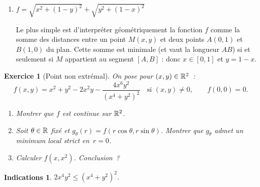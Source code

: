 \documentclass[11pt,a4paper]{article}
\renewcommand{\le}{\leqslant} \renewcommand{\leq}{\leqslant}
\theoremstyle{exostyle}
\newtheorem{exo}{Exercice}
\newtheorem{ind}{Indications}
\newcommand{\exercice}[1]{} \newcommand{\finexercice}{}
\newcommand{\enonce}{\begin{exo}} \newcommand{\finenonce}{\end{exo}}
\newcommand{\indication}{\begin{ind}} \newcommand{\finindication}{\end{ind}}
\begin{document}
\begin{enumerate}
	\[
	f_x = \ln^2x + 2\ln x + y^2
	\qquad
	f_y = 2xy
	\]
	\[
	f_{xx} = 2\frac{\ln x+1}{x}
	\qquad 
	f_{xy}= 2y
	\qquad 
	f_{yy}= 2x
	\]
	
	Recherche du point critique. Par hypothèse $x>0$, donc $y=0$ et par suite $\ln^2x + 2\ln x=0$,
	d'où $\ln x(\ln x+2)=0$. Ainsi $x=1$ ou $x= e^{-2}$. Les points critiques sont $(1,0)$ et $(e^{-2},0)$.
	
	Le critère de Monge s'applique et indique que  $(1,0)$ est un minimum local alors que $(e^{-2},0)$ est un point-selle.
	
	
	\item $f = \sqrt{x^2+(1-y)^2} + \sqrt{y^2+(1-x)^2}$
	
	Le plus simple est d'interpréter géométriquement la fonction $f$ comme la somme des distances entre un point $M(x,y)$ et deux points $A(0,1)$ et $B(1,0)$ du plan.
	Cette somme est minimale (et vaut la longueur $AB$) si et seulement si $M$ appartient au segment $[A,B]$ : donc $x \in[0,1]$ et $y=1-x$.
	
\end{enumerate}

\fincorrection


\exercice{4182, quercia, 2010/03/11}
\enonce[Point non extrémal]
On pose pour $(x,y)\in\mathbb{R}^2$~:
$$f(x,y) = x^2+y^2-2x^2y - \frac{4x^6y^2}{(x^4+y^2)^2}\quad\text{si }(x,y)\ne 0,
\qquad f(0,0)=0.$$
\begin{enumerate}
	\item Montrer que $f$ est continue sur $\mathbb{R}^2$.
	
	\item Soit $\theta\in\mathbb{R}$ fixé et $g_\theta(r) = f(r\cos\theta,r\sin\theta)$.
	Montrer que $g_\theta$ admet un minimum local strict en~$r=0$.
	
	\item Calculer $f(x,x^2)$. Conclusion~?
	
\end{enumerate}
\finenonce

\indication
$2x^4y^2 \le (x^4+y^2)^2$.
\finindication
\end{document}
